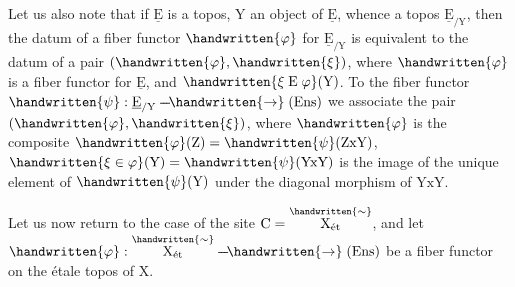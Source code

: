 \begin{lrbox}{\coteSixTypescript}
\begin{minipage}[t]{.96\linewidth}
 Let us also note that if $\underline{\mathrm E}$ is a topos, $\mathrm Y$ an object of $\underline{\mathrm E}$, whence a topos $\underline{\mathrm E}_{/\mathrm Y}$, then the datum of a fiber functor $\handwritten{\varphi}$ for $\underline{\mathrm E}_{/\mathrm Y}$ is equivalent to the datum of a pair $(\handwritten{\varphi},\handwritten{\xi})$, where $\handwritten{\varphi}$ is a fiber functor for $\underline{\mathrm E}$, and $\handwritten{\xi\mathrel{\mathrm E}\varphi}(\mathrm Y)$. To the fiber functor $\handwritten{\psi}:\underline{\mathrm E}_{/\mathrm Y}\mathrel{\mbox{-}\mkern-2mu\mbox{-}\mkern-2mu\mbox{-}\mkern-3mu\handwritten{\to}}(\mathrm{Ens})$ we associate the pair $(\handwritten{\varphi},\handwritten{\xi})$, where $\handwritten{\varphi}$ is the composite $\handwritten{\varphi}(\mathrm Z)=\handwritten{\psi}(\mathrm Z\mathrm{x}\mathrm Y)$, $\handwritten{\xi\in\varphi}(\mathrm Y)=\handwritten{\psi}(\mathrm Y\mathrm{x}\mathrm Y)$ is the image of the unique element of $\handwritten{\psi}(\mathrm Y)$ under the diagonal morphism of $\mathrm Y\mathrm{x}\mathrm Y$.

 Let us now return to the case of the site $\mathrm C=\overset{\handwritten{\sim}}{\mathrm X_{\text{ét}}}$, and let $\handwritten{\varphi}:\overset{\handwritten{\sim}}{\mathrm X_{\text{ét}}}\mathrel{\mbox{-}\mkern-2mu\mbox{-}\mkern-2mu\mbox{-}\mkern-3mu\handwritten{\to}}(\mathrm{Ens})$ be a fiber functor on the étale topos of $\mathrm X$.
\end{minipage}
\end{lrbox}
\noindent{}
